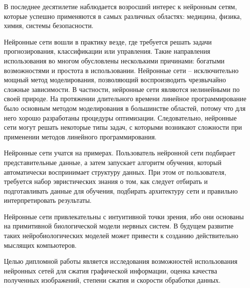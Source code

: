 \label{sec:intro}

В последнее десятилетие наблюдается возросший интерес к нейронным сетям, которые успешно применяются в самых различных областях: медицина, физика, химия, системы безопасности.

Нейронные сети вошли в практику везде, где требуется решать задачи прогнозирования, классификации или управления.
Такие направления использования во многом обусловлены несколькими причинами: богатыми возможностями и простота в использовании.
Нейронные сети – исключительно мощный метод моделирования, позволяющий воспроизводить чрезвычайно сложные зависимости.
В частности, нейронные сети  являются нелинейными по своей природе.
На протяжении длительного времени линейное программирование было основным методом моделирования в большинстве областей, потому что для него хорошо разработаны процедуры оптимизации.
Следовательно, нейронные сети могут решать некоторые типы задач, с которыми возникают сложности при применении методов линейного программирования.

Нейронные сети учатся на примерах. Пользователь нейронной сети подбирает представительные данные, а затем запускает алгоритм обучения, который автоматически воспринимает структуру данных.
При этом от пользователя, требуется набор эвристических знания о том, как следует отбирать и подготавливать данные для обучения, подбирать архитектуру сети и правильно интерпретировать результаты.

Нейронные сети привлекательны с интуитивной точки зрения, ибо они основаны на примитивной биологической модели нервных систем. В будущем развитие таких нейробиологических моделей может привести к созданию действительно мыслящих компьютеров.

Целью дипломной работы является исследования возможностей использования нейронных сетей для сжатия графической информации, оценка качества полученных изображений, степени сжатия и скорости обработки данных.
